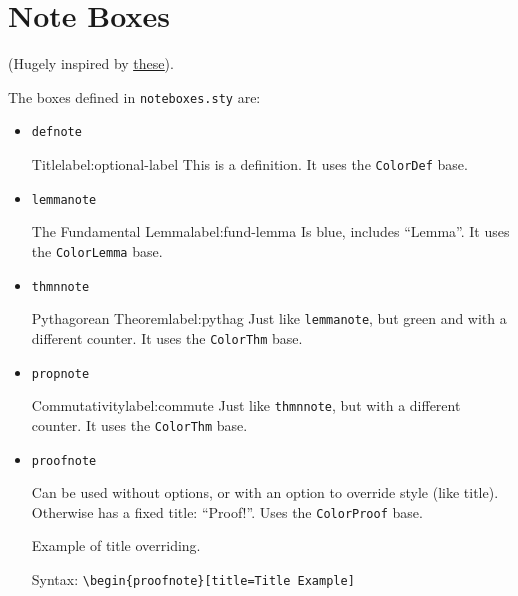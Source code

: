 \documentclass[a4paper,12pt]{report}
\begin{document}
\section{Note Boxes}
(Hugely inspired by \href{https://xyquadrat.ch/blog/latex-boxes/}{\underline{these}}).

The boxes defined in \texttt{noteboxes.sty} are:

\begin{itemize}
    \item \texttt{defnote}
        \begin{defnote}{Title}{label:optional-label}
            This is a definition. It uses the \texttt{ColorDef} base.
        \end{defnote}

    \item \texttt{lemmanote}
        \begin{lemmanote}{The Fundamental Lemma}{label:fund-lemma}
            Is blue, includes ``Lemma''. It uses the \texttt{ColorLemma} base.
        \end{lemmanote}

    \item \texttt{thmnnote}
        \begin{thmnnote}{Pythagorean Theorem}{label:pythag}
            Just like \texttt{lemmanote}, but green and with a different counter. It uses the \texttt{ColorThm} base.
        \end{thmnnote}

    \item \texttt{propnote}
        \begin{propnote}{Commutativity}{label:commute}
            Just like \texttt{thmnnote}, but with a different counter. It uses the \texttt{ColorThm} base.
        \end{propnote}

    \item \texttt{proofnote}

        \begin{proofnote}
            Can be used without options, or with an option to override style (like title). Otherwise has a fixed title: ``Proof!''. Uses the \texttt{ColorProof} base.
        \end{proofnote}

        \begin{proofnote}[title=Title Example]
            Example of title overriding.

            Syntax: \texttt{\textbackslash begin\{proofnote\}[title=Title Example]}
        \end{proofnote}


\end{itemize}
\end{document}
